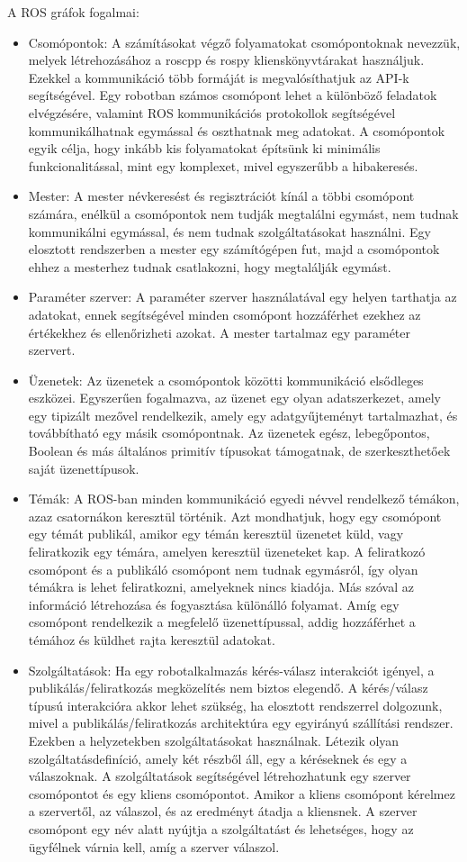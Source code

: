 \documentclass{article}
\begin{document}
A ROS gráfok fogalmai:
\begin{itemize}
    \item Csomópontok: A számításokat végző folyamatokat csomópontoknak nevezzük, melyek létrehozásához a roscpp és rospy klienskönyvtárakat használjuk. Ezekkel a kommunikáció több formáját is megvalósíthatjuk az API-k segítségével. Egy robotban számos csomópont lehet a különböző feladatok elvégzésére, valamint ROS kommunikációs protokollok segítségével kommunikálhatnak egymással és oszthatnak meg adatokat. A csomópontok egyik célja, hogy inkább kis folyamatokat építsünk ki minimális funkcionalitással, mint egy komplexet, mivel egyszerűbb a hibakeresés.
    \item Mester: A mester névkeresést és regisztrációt kínál a többi csomópont számára, enélkül a csomópontok nem tudják megtalálni egymást, nem tudnak kommunikálni egymással, és nem tudnak szolgáltatásokat használni. Egy elosztott rendszerben a mester egy számítógépen fut, majd a csomópontok ehhez a mesterhez tudnak csatlakozni, hogy megtalálják egymást.
    \item  Paraméter szerver: A paraméter szerver használatával egy helyen tarthatja az adatokat, ennek segítségével minden csomópont hozzáférhet ezekhez az értékekhez és ellenőrizheti azokat. A mester tartalmaz egy paraméter szervert.
    \item Üzenetek: Az üzenetek a csomópontok közötti kommunikáció elsődleges eszközei. Egyszerűen fogalmazva, az üzenet egy olyan adatszerkezet, amely egy tipizált mezővel rendelkezik, amely egy adatgyűjteményt tartalmazhat, és továbbítható egy másik csomópontnak. Az üzenetek egész, lebegőpontos, Boolean és más általános primitív típusokat támogatnak, de szerkeszthetőek saját üzenettípusok.
    \item Témák: A ROS-ban minden kommunikáció egyedi névvel rendelkező témákon, azaz csatornákon keresztül történik. Azt mondhatjuk, hogy egy csomópont egy témát publikál, amikor egy témán keresztül üzenetet küld, vagy feliratkozik egy témára, amelyen keresztül üzeneteket kap. A feliratkozó csomópont és a publikáló csomópont nem tudnak egymásról, így olyan témákra is lehet feliratkozni, amelyeknek nincs kiadója. Más szóval az információ létrehozása és fogyasztása különálló folyamat. Amíg egy csomópont rendelkezik a megfelelő üzenettípussal, addig hozzáférhet a témához és küldhet rajta keresztül adatokat.
    \item Szolgáltatások: Ha egy robotalkalmazás kérés-válasz interakciót igényel, a publikálás/feliratkozás megközelítés nem biztos elegendő. A kérés/válasz típusú interakcióra akkor lehet szükség, ha elosztott rendszerrel dolgozunk, mivel a publikálás/feliratkozás architektúra egy egyirányú szállítási rendszer. Ezekben a helyzetekben szolgáltatásokat használnak. Létezik olyan szolgáltatásdefiníció, amely két részből áll, egy a kéréseknek és egy a válaszoknak. A szolgáltatások segítségével létrehozhatunk egy szerver csomópontot és egy kliens csomópontot. Amikor a kliens csomópont kérelmez a szervertől, az válaszol, és az eredményt átadja a kliensnek. A szerver csomópont egy név alatt nyújtja a szolgáltatást és lehetséges, hogy az ügyfélnek várnia kell, amíg a szerver válaszol.

\end{itemize}
\end{document}
